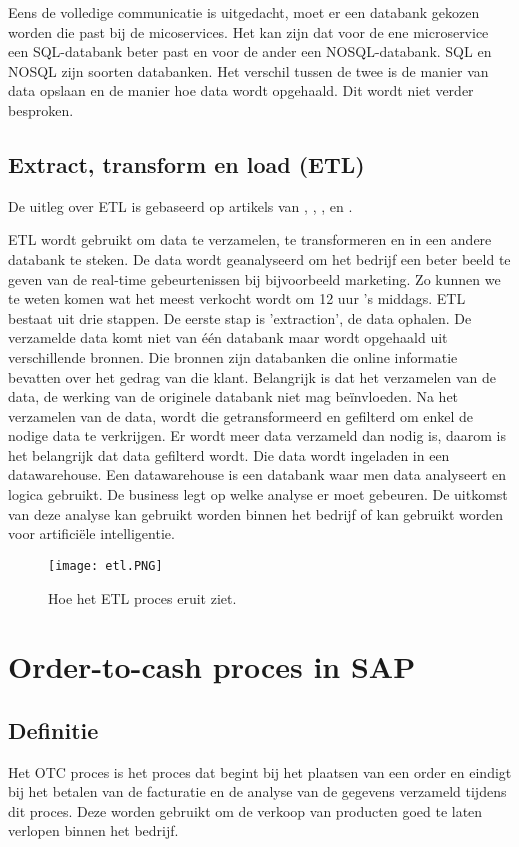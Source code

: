 Eens de volledige communicatie is uitgedacht, moet er een databank gekozen worden die past bij de micoservices. Het kan zijn dat voor de ene microservice een SQL-databank beter past en voor de ander een NOSQL-databank. SQL en NOSQL zijn soorten databanken. Het verschil tussen de twee is de manier van data opslaan en de manier hoe data wordt opgehaald. Dit wordt niet verder besproken.
 
\subsection{Extract, transform en load (ETL)}
De uitleg over ETL is gebaseerd op artikels van \textcite{Loshin2019}, \textcite{Alley2018}, \textcite{Stich2019}, \textcite{Guru2019} en \textcite{Naveen2016}.

ETL wordt gebruikt  om data te verzamelen, te transformeren en in een andere databank te steken. De data wordt geanalyseerd om het bedrijf een beter beeld te geven van de real-time gebeurtenissen bij bijvoorbeeld marketing. Zo kunnen we te weten komen wat het meest verkocht wordt om 12 uur 's middags. 
ETL bestaat uit drie stappen.
De eerste stap is 'extraction', de data ophalen. De verzamelde data komt niet van één databank maar wordt opgehaald uit verschillende bronnen. Die bronnen zijn databanken die online informatie bevatten over het gedrag van die klant. Belangrijk is dat het verzamelen van de data, de werking van de originele databank niet mag beïnvloeden.
Na het verzamelen van de data, wordt die getransformeerd en gefilterd om enkel de nodige data te verkrijgen. Er wordt meer data verzameld dan nodig is, daarom is het belangrijk dat data gefilterd wordt.
Die data wordt ingeladen in een datawarehouse. Een datawarehouse is een databank waar men data analyseert en logica gebruikt. De business legt op welke analyse er moet gebeuren. De uitkomst van deze analyse kan gebruikt worden binnen het bedrijf of kan gebruikt worden voor artificiële intelligentie.  

\begin{figure}[h!]
	\texttt{[image: etl.PNG]}
	\centering
	\caption{Hoe het ETL proces eruit ziet. \textcite{Panolapy2019}}
\end{figure}


\section{Order-to-cash proces in SAP}
\subsection{Definitie}
Het OTC proces is het proces dat begint bij het plaatsen van een order en eindigt bij het betalen van de facturatie en de analyse van de gegevens verzameld tijdens dit proces. Deze worden gebruikt om de verkoop van producten goed te laten verlopen binnen het bedrijf.

